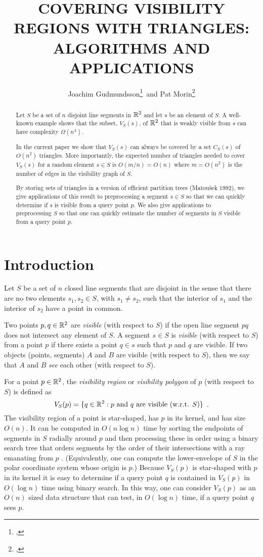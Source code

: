 \documentclass{patmorin}
\title{\MakeUppercase{Covering Visibility Regions with Triangles:\newline
       Algorithms and Applications}}
\author{Joachim Gudmundsson\thanks{\affil{NICTA},
\email{joachim.gudmundsson@nicta.com.au}}\, 
       and Pat Morin\thanks{\affil{Carleton University},
\email{morin@scs.carleton.ca}}}
\begin{document}
\maketitle
\begin{abstract}
Let $S$ be a set of $n$ disjoint line segments in $\mathbb{R}^2$ and let $s$ be an
element of $S$.  A well-known example shows that the subset, $V_S(s)$, of
$\mathbb{R}^2$ that is weakly visible from $s$ can have complexity $\Omega(n^4)$.

In the current paper we show that $V_S(s)$ can always be covered by a set
$C_S(s)$ of $O(n^2)$ triangles.  More importantly, the expected number
of triangles needed to cover $V_S(s)$ for a random element $s\in S$ is
$O(m/n)=O(n)$ where $m=O(n^2)$ is the number of edges in the visibility
graph of $S$.

By storing sets of triangles in a version of efficient partition trees
(Matou\v{s}ek 1992), we give applications of this result to preprocessing
a segment $s\in S$ so that we can quickly determine if $s$ is visible
from a query point $p$.  We also give applications to preprocessing $S$
so that one can quickly estimate the number of segments in $S$ visible
from a query point $p$.
\end{abstract}

\section{Introduction}

Let $S$ be a set of $n$ closed line segments that are disjoint in the
sense that there are no two elements $s_1,s_2\in S$, with $s_1\neq s_2$,
such that the interior of $s_1$ and the interior of $s_2$ have a point
in common.

Two points $p,q\in\mathbb{R}^2$ are \emph{visible} (with respect to $S$) if the
open line segment $pq$ does not intersect any element of $S$.  A segment
$s\in S$ is \emph{visible} (with respect to $S$) from a point $p$ if there
exists a point $q\in s$ such that $p$ and $q$ are visible.  If two objects
(points, segments) $A$ and $B$ are visible (with respect to $S$), then we
say that $A$ and $B$ \emph{see} each other (with respect to $S$).

For a point $p\in\mathbb{R}^2$, the \emph{visibility region} or \emph{visibility
polygon} of $p$ (with respect to $S$) is defined as
\[
   V_S(p)=\{q\in\mathbb{R}^2:\mbox{$p$ and $q$ are visible (w.r.t. $S$)}\} 
      \enspace .
\]
The visibility region of a point is star-shaped, has $p$ in its
kernel, and has size $O(n)$. It can be computed in $O(n\log n)$ time
by sorting the endpoints of segments in $S$ radially around $p$ and
then processing these in order using a binary search tree that orders
segments by the order of their intersections with a ray emanating from $p$
\cite{a85,so84}. (Equivalently, one can compute the lower-envelope of $S$
in the polar coordinate system whose origin is $p$.)  Because $V_S(p)$
is star-shaped with $p$ in its kernel it is easy to determine if a query
point $q$ is contained in $V_S(p)$ in $O(\log n)$ time using binary
search. In this way, one can consider $V_S(p)$ as an $O(n)$ sized data
structure that can test, in $O(\log n)$ time, if a query point $q$
sees $p$.
\end{document}
